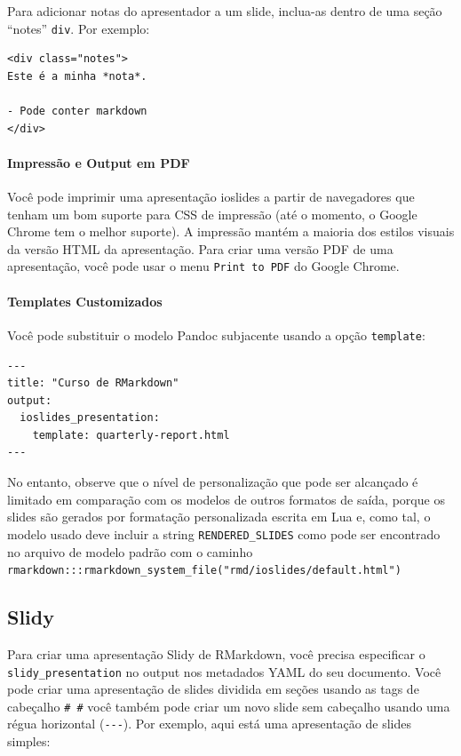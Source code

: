 \documentclass[
]{book}
\begin{document}
Para adicionar notas do apresentador a um slide, inclua-as dentro de uma seção ``notes'' \texttt{div}. Por exemplo:

\begin{verbatim}
<div class="notes">
Este é a minha *nota*.

- Pode conter markdown
</div>
\end{verbatim}

\hypertarget{impressuxe3o-e-output-em-pdf}{%
\paragraph{Impressão e Output em PDF}\label{impressuxe3o-e-output-em-pdf}}

Você pode imprimir uma apresentação ioslides a partir de navegadores que tenham um bom suporte para CSS de impressão (até o momento, o Google Chrome tem o melhor suporte). A impressão mantém a maioria dos estilos visuais da versão HTML da apresentação.
Para criar uma versão PDF de uma apresentação, você pode usar o menu \texttt{Print\ to\ PDF} do Google Chrome.

\hypertarget{templates-customizados}{%
\paragraph{Templates Customizados}\label{templates-customizados}}

Você pode substituir o modelo Pandoc subjacente usando a opção \texttt{template}:

\begin{verbatim}
---
title: "Curso de RMarkdown"
output:
  ioslides_presentation:
    template: quarterly-report.html
---
\end{verbatim}

No entanto, observe que o nível de personalização que pode ser alcançado é limitado em comparação com os modelos de outros formatos de saída, porque os slides são gerados por formatação personalizada escrita em Lua e, como tal, o modelo usado deve incluir a string \texttt{RENDERED\_SLIDES} como pode ser encontrado no arquivo de modelo padrão com o caminho \texttt{rmarkdown:::rmarkdown\_system\_file("rmd/ioslides/default.html")}

\hypertarget{slidy}{%
\subsection{Slidy}\label{slidy}}

Para criar uma apresentação Slidy de RMarkdown, você precisa especificar o \texttt{slidy\_presentation} no output nos metadados YAML do seu documento. Você pode criar uma apresentação de slides dividida em seções usando as tags de cabeçalho \texttt{\#\ \#} você também pode criar um novo slide sem cabeçalho usando uma régua horizontal (\texttt{-\/-\/-}). Por exemplo, aqui está uma apresentação de slides simples:
\end{document}
